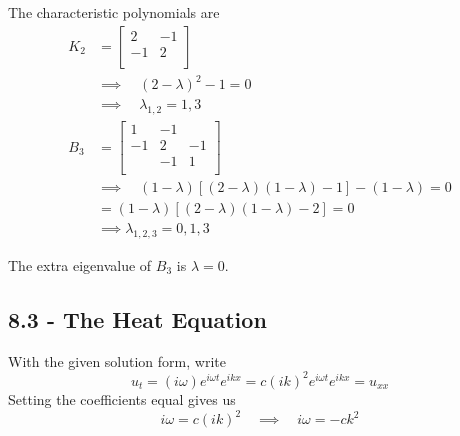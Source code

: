 \documentclass[a4paper]{article}
\begin{document}

The characteristic polynomials are
\begin{align*}
	K_{2} & = \begin{bmatrix}
		2 & -1 \\
		-1 & 2 \\
	\end{bmatrix} \\
	      & \implies \quad \!\left( 2 - \lambda \right)^{2} - 1 = 0 \\
	      & \implies \quad \lambda_{1,2} = 1, 3 \\
	B_{3} & = \begin{bmatrix}
		1 & -1 & \\
		-1 & 2 & -1 \\
		 & -1 & 1 \\
	\end{bmatrix} \\ 
	      & \implies \quad \!\left( 1 - \lambda \right)\!\left[ \!\left( 2 - \lambda \right)\!\left( 1 - \lambda \right) - 1 \right] - \!\left( 1 - \lambda \right) = 0 \\
	      & = \!\left( 1 - \lambda \right) \!\left[ \!\left( 2 - \lambda \right)\!\left( 1 - \lambda \right) - 2 \right] = 0 \\
	      & \implies \lambda_{1,2,3} = 0, 1, 3
\end{align*}

The extra eigenvalue of \( B_{3} \) is \( \lambda = 0 \).

\newpage

\subsection{\textsf{8.3 - The Heat Equation}}

With the given solution form, write
\[
	u_{t} = \!\left( i \omega \right)e^{i \omega t}e^{ikx} = c \!\left( ik \right)^{2}e^{i \omega t}e^{ikx} = u_{xx} 
\]
Setting the coefficients equal gives us
\[
	i \omega = c \!\left( ik \right)^{2} \quad \implies \quad i \omega = -ck^{2}
\]
\end{document}

